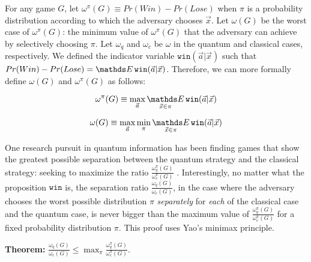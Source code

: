 For any game $G$, let $\omega^\pi(G) \equiv Pr(Win) - Pr(Lose)$ when $\pi$ is a probability distribution according to which the adversary chooses $\vec{x}$. Let $\omega(G)$ be the worst case of $\omega^\pi(G)$: the minimum value of $\omega^\pi(G)$ that the adversary can achieve by selectively choosing $\pi$. Let $\omega_q$ and $\omega_c$ be $\omega$ in the quantum and classical cases, respectively. We defined the indicator variable $\texttt{win}(\vec{a}|\vec{x})$ such that $Pr(Win) - Pr(Lose) = \Expected \texttt{win}(\vec{a}|\vec{x})$. Therefore, we can more formally define $\omega(G)$ and $\omega^\pi(G)$ as follows:

$$\omega^\pi(G) \equiv \max_{\vec{a}} \Expected_{\vec{x} \in \pi} \texttt{win}(\vec{a}|\vec{x})$$

$$\omega(G) \equiv \max_{\vec{a}} \min_\pi \Expected_{\vec{x} \in \pi} \texttt{win}(\vec{a}|\vec{x})$$

One research pursuit in quantum information has been finding games that show the greatest possible separation between the quantum strategy and the classical strategy: seeking to maximize the ratio $\frac{\omega_q^\pi(G)}{\omega_c^\pi(G)}$ \cite{ABBSSV}. Interestingly, no matter what the proposition $\texttt{win}$ is, the separation ratio $\frac{\omega_q(G)}{\omega_c(G)}$, in the case where the adversary chooses the worst possible distribution $\pi$ \emph{separately} for \emph{each} of the classical case and the quantum case, is never bigger than the maximum value of $\frac{\omega_q^\pi(G)}{\omega_c^\pi(G)}$ for a fixed probability distribution $\pi$. This proof uses Yao's minimax principle.

\textbf{Theorem:} $\frac{\omega_q(G)}{\omega_c(G)} \leq \max_\pi \frac{\omega_q^\pi(G)}{\omega_c^\pi(G)}$.

